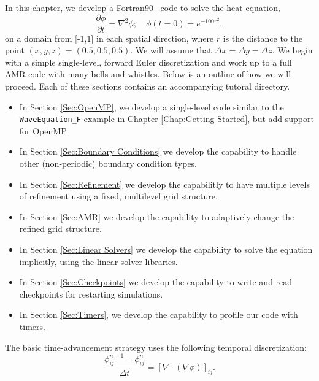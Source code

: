 In this chapter, we develop a Fortran90 \BoxLib\ code to solve the heat equation,
\begin{equation}
\frac{\partial\phi}{\partial t} = \nabla^2 \phi; \quad \phi(t=0) = e^{-100r^2},
\end{equation}
on a domain from [-1,1] in each spatial direction, where $r$ is the distance
to the point $(x,y,z) = (0.5,0.5,0.5)$.  We will
assume that $\Delta x = \Delta y = \Delta z$.  We begin with a simple single-level, 
forward Euler discretization and work up to
a full AMR code with many bells and whistles.  Below is an outline of how we will 
proceed.  Each of these sections contains an accompanying tutoral directory.
\begin{itemize}

\item In Section \ref{Sec:OpenMP}, we develop a single-level code similar to the
{\tt WaveEquation\_F} example in Chapter \ref{Chap:Getting Started}, but add 
support for OpenMP.

\item In Section \ref{Sec:Boundary Conditions} we develop the capability to handle
other (non-periodic) boundary condition types.

\item In Section \ref{Sec:Refinement} we develop the capabilitly to have multiple
levels of refinement using a fixed, multilevel grid structure.

\item In Section \ref{Sec:AMR} we develop the capability to adaptively change the
refined grid structure.

\item In Section \ref{Sec:Linear Solvers} we develop the capability to solve the
equation implicitly, using the linear solver libraries.

\item In Section \ref{Sec:Checkpoints} we develop the capability to write and read
checkpoints for restarting simulations.

\item In Section \ref{Sec:Timers}, we develop the capability to profile our code
with timers.

\end{itemize}
The basic time-advancement strategy uses the following temporal discretization:
\begin{equation}
\frac{\phi_{ij}^{n+1} - \phi_{ij}^n}{\Delta t} = \left[\nabla\cdot(\nabla\phi)\right]_{ij}.
\end{equation}
